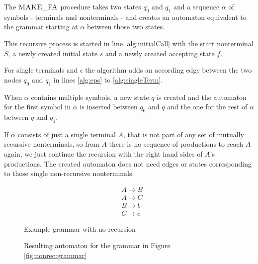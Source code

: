 The $\textproc{MAKE\_FA}$ procedure takes two states $q_0$ and $q_1$ and a sequence $\alpha$ of symbols - terminals and nonterminals - and creates an automaton equivalent to the grammar starting at $\alpha$ between those two states.

This recursive process is started in line \ref{alg:initialCall} with the start nonterminal $S$, a newly created initial state $s$ and a newly created accepting state $f$.

For single terminals and $\epsilon$ the algorithm adds an according edge between the two nodes $q_0$ and $q_1$ in lines \ref{alg:eps} to \ref{alg:singleTerm}.

When $\alpha$ contains multiple symbols, a new state $q$ is created and the automaton for the first symbol in $\alpha$ is inserted between $q_0$ and $q$ and the one for the rest of $\alpha$ between $q$ and $q_1$. 

If $\alpha$ consists of just a single terminal $A$, that is not part of any set of mutually recursive nonterminals, so from $A$ there is no sequence of productions to reach $A$ again, we just continue the recursion with the right hand sides of $A$'s productions. The created automaton does not need edges or states corresponding to those single non-recursive nonterminals. 


\begin{figure}[h]
	\begin{minipage}[b]{.45\linewidth}
		\begin{align*}
			&A \rightarrow B\\
			&A \rightarrow C\\
			&B \rightarrow b\\
			&C \rightarrow c
		\end{align*}
		\caption{Example grammar with no recursion}
		\label{fig:nonrec:grammar}
	\end{minipage}
	\hfill
	\begin{minipage}[b]{.45\linewidth}
		\caption{Resulting automaton for the grammar in Figure \ref{fig:nonrec:grammar}}
		\label{fig:nonrec:automaton}
	\end{minipage}
\end{figure}


